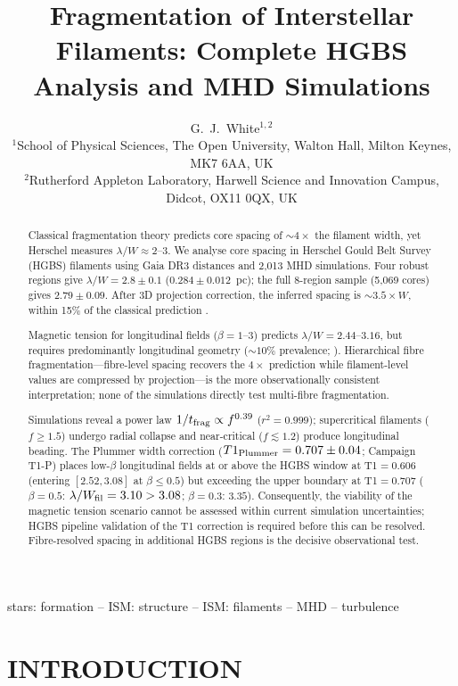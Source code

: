 \documentclass[twoside,twocolumn]{mnras}
\title{Fragmentation of Interstellar Filaments: Complete HGBS Analysis and MHD Simulations}
\author[G.~J.~White]{G.~J.~White$^{1,2}$\\
$^{1}$School of Physical Sciences, The Open University, Walton Hall, Milton Keynes, MK7 6AA, UK\\
$^{2}$Rutherford Appleton Laboratory, Harwell Science and Innovation Campus, Didcot, OX11 0QX, UK}
\begin{document}
\maketitle

\begin{abstract}
Classical fragmentation theory predicts core spacing of ${\sim}4\times$ the filament
width, yet Herschel measures $\lambda/W \approx 2$--$3$. We analyse core spacing in
Herschel Gould Belt Survey (HGBS) filaments using Gaia DR3 distances and 2,013 MHD
simulations. Four robust regions give $\lambda/W = 2.8 \pm 0.1$
($0.284 \pm 0.012$~pc); the full 8-region sample (5,069 cores) gives $2.79 \pm 0.09$.
After 3D projection correction, the inferred spacing is ${\sim}3.5\times W$, within
15\% of the classical prediction \citep{Inutsuka1992}.

Magnetic tension for longitudinal fields ($\beta = 1$--$3$) predicts
$\lambda/W = 2.44$--$3.16$, but requires predominantly longitudinal geometry
(${\sim}10\%$ prevalence; \citealt{Planck2016}).
Hierarchical fibre fragmentation---fibre-level spacing recovers the $4\times$ prediction
\citep{Yang2024} while filament-level values are compressed by projection---is the more
observationally consistent interpretation; none of the simulations directly test
multi-fibre fragmentation.

Simulations reveal a power law $1/t_{\rm frag} \propto f^{0.39}$ ($r^2 = 0.999$);
supercritical filaments ($f \geq 1.5$) undergo radial collapse \citep{Nagasawa1987}
and near-critical ($f \lesssim 1.2$) produce longitudinal beading.
The Plummer width correction ($T1_{\rm Plummer} = 0.707 \pm 0.04$; Campaign T1-P)
places low-$\beta$ longitudinal fields at or above the HGBS window at T1$=0.606$
(entering $[2.52, 3.08]$ at $\beta \leq 0.5$) but exceeding the upper boundary at
T1$=0.707$ ($\beta=0.5$: $\lambda/W_{\rm fil} = 3.10 > 3.08$; $\beta=0.3$: $3.35$).
Consequently, the viability of the magnetic tension scenario cannot be assessed within
current simulation uncertainties; HGBS pipeline validation of the T1 correction is
required before this can be resolved. Fibre-resolved spacing in additional HGBS regions
is the decisive observational test.
\end{abstract}

\begin{keywords}
stars: formation -- ISM: structure -- ISM: filaments -- MHD -- turbulence
\end{keywords}

\section{INTRODUCTION}
\end{document}
